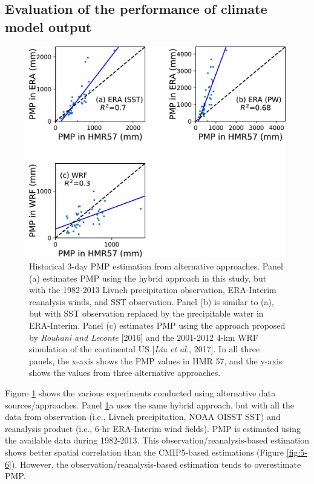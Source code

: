 \subsection{Evaluation of the performance of climate model output}

\begin{figure}[htbp]
	\includegraphics[width=\linewidth]{pics/ch5/fig12.jpg}
	\caption{Historical 3-day PMP estimation from alternative approaches. Panel (a) estimates PMP using the hybrid approach in this study, but with the 1982-2013 Livneh precipitation observation, ERA-Interim reanalysis winds, and SST observation. Panel (b) is similar to (a), but with SST observation replaced by the precipitable water in ERA-Interim. Panel (c) estimates PMP using the approach proposed by \textit{Rouhani and Leconte} [2016] and the 2001-2012 4-km WRF simulation of the continental US [\textit{Liu et al.}, 2017]. In all three panels, the x-axis shows the PMP values in HMR 57, and the y-axis shows the values from three alternative approaches.}
	\label{fig:5-12}
\end{figure}

Figure \ref{fig:5-12} shows the various experiments conducted using alternative data sources/approaches. Panel \ref{fig:5-12}a uses the same hybrid approach, but with all the data from observation (i.e., Livneh precipitation, NOAA OISST SST) and reanalysis product (i.e., 6-hr ERA-Interim wind fields). PMP is estimated using the available data during 1982-2013. This observation/reanalysis-based estimation shows better spatial correlation than the CMIP5-based estimations (Figure \ref{fig:5-6}). However, the observation/reanalysis-based estimation tends to overestimate PMP.


